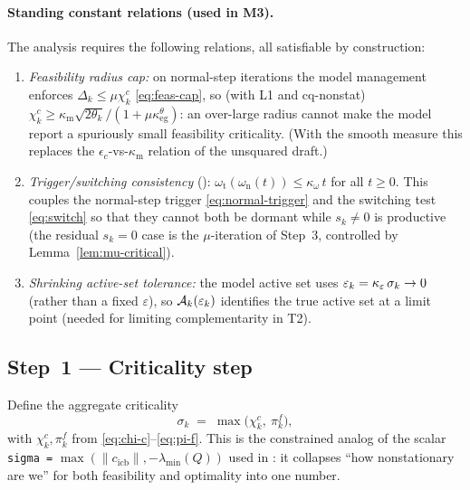 \paragraph{Standing constant relations (used in M3).} The analysis requires the
following relations, all satisfiable by construction:
\begin{enumerate}\itemsep1pt
  \item \emph{Feasibility radius cap:} on normal-step iterations the model management
        enforces $\Delta_k\le\mu\chi_k^c$ \eqref{eq:feas-cap}, so (with L1 and
        cq-nonstat) $\chi_k^c\ge\kappa_{\mathrm m}\sqrt{2\theta_k}/(1+\mu\kappa_{\mathrm{eg}}^\theta)$:
        an over-large radius cannot make the model report a spuriously small
        feasibility criticality. (With the smooth measure this replaces the
        $\epsilon_c$-vs-$\kappa_{\mathrm m}$ relation of the unsquared draft.)
  \item \emph{Trigger/switching consistency} (\citealp[(2.31)]{GouldToint2010}):
        $\omega_{\mathrm t}(\omega_{\mathrm n}(t))\le\kappa_\omega\,t$ for all
        $t\ge0$. This couples the normal-step trigger \eqref{eq:normal-trigger} and
        the switching test \eqref{eq:switch} so that they cannot both be dormant
        while $s_k\ne0$ is productive (the residual $s_k=0$ case is the
        $\mu$-iteration of Step~3, controlled by Lemma~\ref{lem:mu-critical}).
  \item \emph{Shrinking active-set tolerance:} the model active set uses
        $\varepsilon_k=\kappa_{\varepsilon}\,\sigma_k\to0$ (rather than a fixed
        $\varepsilon$), so $\mathcal{A}_k(\varepsilon_k)$ identifies the true active set at a
        limit point (needed for limiting complementarity in T2).
\end{enumerate}

\subsection{Step~1 --- Criticality step}
\label{sec:algo-crit}

Define the aggregate criticality
\begin{equation}
  \label{eq:sigma}
  \sigma_k \;=\; \max\bigl(\chi_k^c,\ \pi_k^f\bigr),
\end{equation}
with $\chi_k^c,\pi_k^f$ from \eqref{eq:chi-c}--\eqref{eq:pi-f}. This is the
constrained analog of the scalar \verb|sigma =|
$\max(\|c_{\mathrm{icb}}\|,-\lambda_{\min}(Q))$ used in
: it collapses ``how nonstationary are we'' for both
feasibility and optimality into one number.

